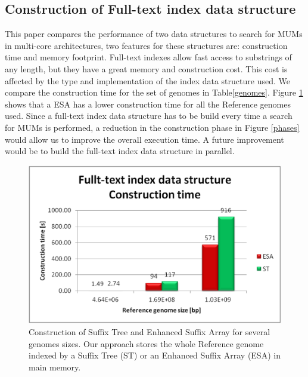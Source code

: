 \documentclass[runningheads,a4paper]{llncs}
\begin{document}
\subsection{Construction of Full-text index data structure}
This paper compares the performance of two data structures to search for MUMs in multi-core architectures, two features for these structures are: construction time and memory footprint. Full-text indexes allow fast access to substrings of any length, but they have a great memory and construction cost. This cost is affected by the type and implementation of the index data structure used. We compare the construction time for the set of genomes in Table\ref{genomes}. Figure \ref{fig:construction} shows that a ESA has a lower construction time for all the Reference genomes used. Since a full-text index data structure has to be build every time a search for MUMs is performed, a reduction in the construction phase in Figure \ref{phases} would allow us to improve the overall execution time. A future improvement would be to build the full-text index data structure in parallel.
 \begin{figure}[h]
  \centering
  \includegraphics[scale=0.6]{construction.eps}
  \caption{Construction of Suffix Tree and Enhanced Suffix Array for several genomes sizes. Our approach stores the whole Reference genome indexed by a Suffix Tree (ST) or an Enhanced Suffix Array (ESA) in main memory.}
  \label{fig:construction}
 \end{figure}  
\end{document}
